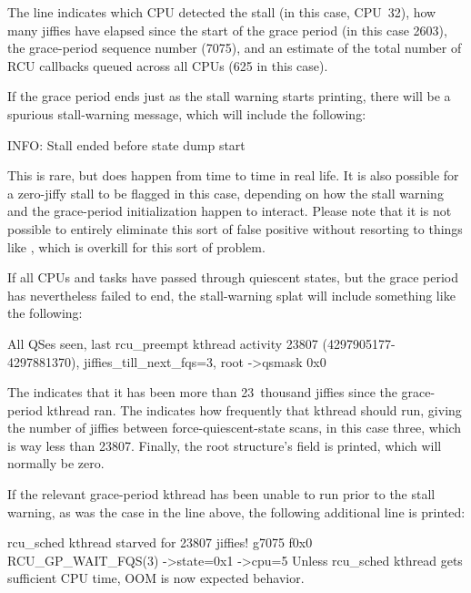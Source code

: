 The  line indicates which CPU detected the stall (in this
case, CPU~32), how many jiffies have elapsed since the start of the grace
period (in this case 2603), the grace-period sequence number (7075), and
an estimate of the total number of RCU callbacks queued across all CPUs
(625 in this case).

If the grace period ends just as the stall warning starts printing,
there will be a spurious stall-warning message, which will include
the following:

\begin{VerbatimU}
	INFO: Stall ended before state dump start
\end{VerbatimU}

This is rare, but does happen from time to time in real life.
It is also
possible for a zero-jiffy stall to be flagged in this case, depending
on how the stall warning and the grace-period initialization happen to
interact.
Please note that it is not possible to entirely eliminate this
sort of false positive without resorting to things like ,
which is overkill for this sort of problem.

If all CPUs and tasks have passed through quiescent states, but the
grace period has nevertheless failed to end, the stall-warning splat
will include something like the following:

\begin{VerbatimU}[breaklines=true]
	All QSes seen, last rcu_preempt kthread activity 23807 (4297905177-4297881370), jiffies_till_next_fqs=3, root ->qsmask 0x0
\end{VerbatimU}

The  indicates that it has been more than 23~thousand jiffies
since the grace-period kthread ran.
The 
indicates how frequently that kthread should run, giving the number
of jiffies between force-quiescent-state scans, in this case three,
which is way less than 23807.
Finally, the root  structure's
 field is printed, which will normally be zero.

If the relevant grace-period kthread has been unable to run prior to
the stall warning, as was the case in the  line above,
the following additional line is printed:

\begin{VerbatimU}[breaklines=true]
	rcu_sched kthread starved for 23807 jiffies! g7075 f0x0 RCU_GP_WAIT_FQS(3) ->state=0x1 ->cpu=5
	Unless rcu_sched kthread gets sufficient CPU time, OOM is now expected behavior.
\end{VerbatimU}


